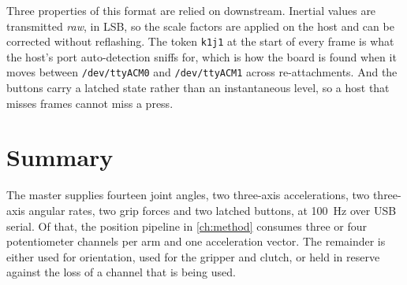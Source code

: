 Three properties of this format are relied on downstream. Inertial values are
transmitted \emph{raw}, in LSB, so the scale factors are applied on the host
and can be corrected without reflashing. The token \texttt{k1j1} at the start
of every frame is what the host's port auto-detection sniffs for, which is how
the board is found when it moves between \texttt{/dev/ttyACM0} and
\texttt{/dev/ttyACM1} across re-attachments. And the buttons carry a latched
state rather than an instantaneous level, so a host that misses frames cannot
miss a press.

\section{Summary}

The master supplies fourteen joint angles, two three-axis accelerations, two
three-axis angular rates, two grip forces and two latched buttons, at
\SI{100}{\hertz} over USB serial. Of that, the position pipeline in
\cref{ch:method} consumes three or four potentiometer channels per arm and one
acceleration vector. The remainder is either used for orientation, used for
the gripper and clutch, or held in reserve against the loss of a channel that
is being used.
